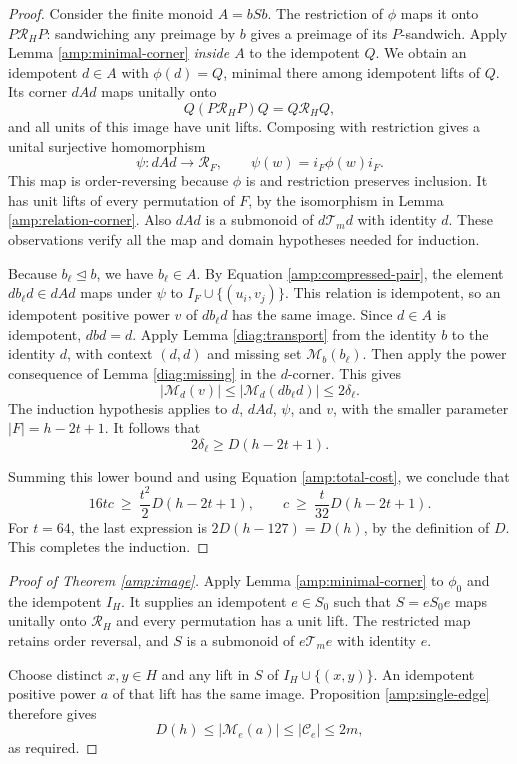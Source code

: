 \begin{proof}
Consider the finite monoid $A=bSb$.  The restriction of
$\phi$ maps it onto $P\mathcal R_HP$: sandwiching any
preimage by $b$ gives a preimage of its $P$-sandwich.
Apply Lemma \ref{amp:minimal-corner} \emph{inside $A$} to
the idempotent $Q$.  We obtain an idempotent $d\in A$ with
$\phi(d)=Q$, minimal there among idempotent lifts of $Q$.
Its corner $dAd$ maps unitally onto
\[
 Q(P\mathcal R_HP)Q=Q\mathcal R_HQ,
\]
and all units of this image have unit lifts.  Composing with
restriction gives a unital surjective homomorphism
\begin{equation}
 \psi:dAd\longrightarrow\mathcal R_F,
 \qquad \psi(w)=i_F\phi(w)i_F.
 \label{amp:smaller-map}
\end{equation}
This map is order-reversing because $\phi$ is and restriction
preserves inclusion.  It has unit lifts of every permutation
of $F$, by the isomorphism in Lemma
\ref{amp:relation-corner}.  Also $dAd$ is a submonoid of
$d\mathcal T_md$ with identity $d$.
These observations verify all the map and domain hypotheses
needed for induction.

Because $b_\ell\trianglelefteq b$, we have $b_\ell\in A$.
By Equation \eqref{amp:compressed-pair}, the element
$db_\ell d\in dAd$ maps under $\psi$ to
$I_F\cup\{(u_i,v_j)\}$.  This relation is idempotent, so
an idempotent positive power $v$ of $db_\ell d$ has the same
image.  Since $d\in A$ is idempotent, $dbd=d$.
Apply Lemma \ref{diag:transport} from the identity $b$ to
the identity $d$, with context $(d,d)$ and missing set
$\mathcal M_b(b_\ell)$.  Then apply the power consequence
of Lemma \ref{diag:missing} in the $d$-corner.  This gives
\begin{equation}
 |\mathcal M_d(v)|
 \leq |\mathcal M_d(db_\ell d)|
 \leq 2\delta_\ell.
 \label{amp:step-cost}
\end{equation}
The induction hypothesis applies to $d$, $dAd$, $\psi$,
and $v$, with the smaller parameter $|F|=h-2t+1$.
It follows that
\[
 2\delta_\ell\geq D(h-2t+1).
\]

Summing this lower bound and using Equation
\eqref{amp:total-cost}, we conclude that
\[
 16tc\ \geq\ \frac{t^2}{2}D(h-2t+1),
 \qquad
 c\ \geq\ \frac{t}{32}D(h-2t+1).
\]
For $t=64$, the last expression is
$2D(h-127)=D(h)$, by the definition of $D$.
This completes the induction.
\end{proof}

\begin{proof}[Proof of Theorem \ref{amp:image}]
Apply Lemma \ref{amp:minimal-corner} to $\phi_0$ and the
idempotent $I_H$.  It supplies an idempotent $e\in S_0$
such that $S=eS_0e$ maps unitally onto $\mathcal R_H$ and
every permutation has a unit lift.  The restricted map
retains order reversal, and $S$ is a submonoid of
$e\mathcal T_me$ with identity $e$.

Choose distinct $x,y\in H$ and any lift in $S$ of
$I_H\cup\{(x,y)\}$.  An idempotent positive power $a$
of that lift has the same image.  Proposition
\ref{amp:single-edge} therefore gives
\[
 D(h)\leq|\mathcal M_e(a)|\leq|\mathcal C_e|\leq2m,
\]
as required.
\end{proof}
